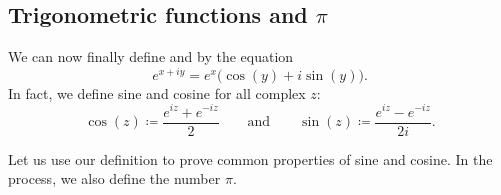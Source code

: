 \subsection{Trigonometric functions and $\pi$}

We can now finally define \emph{} and \emph{}
by the equation
\begin{equation*}
e^{x+iy} = e^x \bigl( \cos(y) + i \sin(y) \bigr) .
\end{equation*}
In fact, we define sine and cosine for all complex $z$:
\begin{equation*}
\cos(z) \coloneqq \frac{e^{iz} + e^{-iz}}{2}
\qquad\text{and}\qquad
\sin(z) \coloneqq \frac{e^{iz} - e^{-iz}}{2i} .
\end{equation*}

Let us use our definition to prove common properties of
sine and cosine.  In the process, we also define the
number $\pi$.

